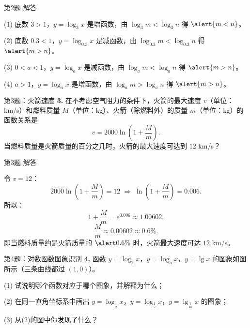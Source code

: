 \documentclass[10pt,aspectratio=169,serif]{beamer}
\begin{document}
\begin{frame}[t]{第2题 解答}
\begin{tcolorbox}[colback=orange!10,colframe=orange,title=\textbf{解}]
(1) 底数 $3>1$，$y=\log_3 x$ 是增函数，由 $\log_3 m<\log_3 n$ 得 $\alert{m<n}$。

(2) 底数 $0.3<1$，$y=\log_{0.3} x$ 是减函数，由 $\log_{0.3} m<\log_{0.3} n$ 得 $\alert{m>n}$。

(3) $0<a<1$，$y=\log_a x$ 是减函数，由 $\log_a m<\log_a n$ 得 $\alert{m>n}$。

(4) $a>1$，$y=\log_a x$ 是增函数，由 $\log_a m>\log_a n$ 得 $\alert{m>n}$。
\end{tcolorbox}
\end{frame}

\begin{frame}[t]{第3题：火箭速度}
\textbf{3.} 在不考虑空气阻力的条件下，火箭的最大速度 $v$（单位：km/s）和燃料质量 $M$（单位：kg）、火箭（除燃料外）的质量 $m$（单位：kg）的函数关系是
\[
v = 2000\ln\left(1+\frac{M}{m}\right).
\]
当燃料质量是火箭质量的百分之几时，火箭的最大速度可达到 $12$ km/s？
\end{frame}

\begin{frame}[t]{第3题 解答}
\begin{tcolorbox}[colback=orange!10,colframe=orange,title=\textbf{解}]
令 $v=12$：
\[
2000\ln\left(1+\frac{M}{m}\right) = 12 \;\Longrightarrow\; \ln\left(1+\frac{M}{m}\right) = 0.006.
\]
所以：
\[
1+\frac{M}{m} = e^{0.006} \approx 1.00602.
\]
\[
\frac{M}{m} \approx 0.00602 \approx 0.6\%.
\]
即当燃料质量约是火箭质量的 $\alert{0.6\%}$ 时，火箭最大速度可达 $12$ km/s。
\end{tcolorbox}
\end{frame}

\begin{frame}[t]{第4题：对数函数图象识别}
\textbf{4.} 函数 $y=\log_2 x$，$y=\log_5 x$，$y=\lg x$ 的图象如图所示（三条曲线都过 $(1,0)$）。

\vspace{0.3em}
(1) 试说明哪个函数对应于哪个图象，并解释为什么；

(2) 在同一直角坐标系中画出 $y=\log_{\frac{1}{2}} x$，$y=\log_{\frac{1}{5}} x$，$y=\lg_{\frac{1}{10}} x$ 的图象；

(3) 从(2)的图中你发现了什么？
\end{frame}
\end{document}
